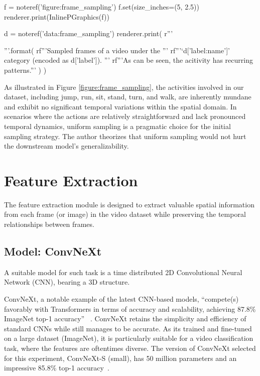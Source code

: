 \documentclass[letterpaper]{article} %
\begin{document}
\begin{figure*}[t]
  \centering
  \renewcommand\sffamily{}
  \begin{python}
    f = noteref('figure:frame_sampling')
    f.set(size_inches=(5, 2.5))
    renderer.print(InlinePGraphics(f))
  \end{python}
  \begin{python}
    d = noteref('data:frame_sampling')
    renderer.print(
      r'''\caption{{}}'''.format(
        rf'''Sampled frames of a video under the '''
        rf'''`{d['label:name']}' category (encoded as {d['label']}). '''
        rf'''As can be seen, the acitivity has recurring patterns.'''
      )
    )
  \end{python}\label{figure:frame_sampling}
\end{figure*}

As illustrated in Figure \ref{figure:frame_sampling}, 
the activities involved in our dataset, 
including jump, run, sit, stand, turn, and walk, 
are inherently mundane and exhibit no significant temporal variations within the spatial domain. 
In scenarios where the actions are relatively straightforward and lack pronounced temporal dynamics, 
uniform sampling is a pragmatic choice for the initial sampling strategy.
The author theorizes that uniform sampling would not hurt the downstream model's
generalizability.

\section{Feature Extraction}
The feature extraction module is designed to 
extract valuable spatial information from each frame (or image) 
in the video dataset while preserving 
the temporal relationships between frames.

\subsection{Model: ConvNeXt}
A suitable model for such task is
a time distributed 2D Convolutional Neural Network (CNN),
bearing a 3D structure. 

ConvNeXt, a notable example of the latest CNN-based models,
``compete(s) favorably with Transformers in terms of 
accuracy and scalability, achieving 87.8\% ImageNet top-1 accuracy''
~\citep{liu2022convnet}.
ConvNeXt retains the simplicity and efficiency of standard CNNs
while still manages to be accurate.
As its trained and fine-tuned on a large dataset (ImageNet),
it is particularly suitable for a video classification task,
where the features are oftentimes diverse.
The version of ConvNeXt selected for this experiment,
ConvNeXt-S (small), has 50 million parameters 
and an impressive 85.8\% top-1 accuracy~\citep{liu2022convnet}.
\end{document}
